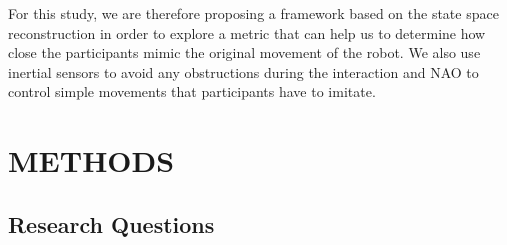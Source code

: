 \documentclass{sig-alternate-05-2015}
\begin{document}
For this study, we are therefore proposing a framework based on the state space reconstruction 
in order to explore a metric that can help us to determine 
how close the participants mimic the original movement of the robot.
We also use inertial sensors to avoid any obstructions during the interaction 
and NAO to control simple movements that participants have to imitate.












% 
% 
% 







\section{METHODS}

\subsection{Research Questions}
\end{document}
